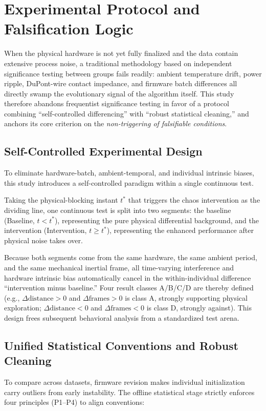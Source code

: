 \documentclass[11pt]{article}
\begin{document}
\section{Experimental Protocol and Falsification Logic}
\label{sec:protocol}

When the physical hardware is not yet fully finalized and the data contain extensive process noise, a traditional methodology based on independent significance testing between groups fails readily: ambient temperature drift, power ripple, DuPont-wire contact impedance, and firmware batch differences all directly swamp the evolutionary signal of the algorithm itself. This study therefore abandons frequentist significance testing in favor of a protocol combining ``self-controlled differencing'' with ``robust statistical cleaning,'' and anchors its core criterion on the \emph{non-triggering of falsifiable conditions}.

\subsection{Self-Controlled Experimental Design}
To eliminate hardware-batch, ambient-temporal, and individual intrinsic biases, this study introduces a self-controlled paradigm within a single continuous test.

Taking the physical-blocking instant $t^*$ that triggers the chaos intervention as the dividing line, one continuous test is split into two segments: the baseline (Baseline, $t < t^*$), representing the pure physical differential background, and the intervention (Intervention, $t \ge t^*$), representing the enhanced performance after physical noise takes over.

Because both segments come from the same hardware, the same ambient period, and the same mechanical inertial frame, all time-varying interference and hardware intrinsic bias automatically cancel in the within-individual difference ``intervention minus baseline.'' Four result classes A/B/C/D are thereby defined (e.g., $\Delta \text{distance} > 0$ and $\Delta \text{frames} > 0$ is class A, strongly supporting physical exploration; $\Delta \text{distance} < 0$ and $\Delta \text{frames} < 0$ is class D, strongly against). This design frees subsequent behavioral analysis from a standardized test arena.

\subsection{Unified Statistical Conventions and Robust Cleaning}
To compare across datasets, firmware revision makes individual initialization carry outliers from early instability. The offline statistical stage strictly enforces four principles (P1--P4) to align conventions:
\end{document}
